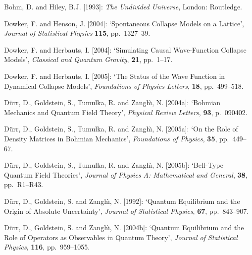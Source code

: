 \documentclass[12pt]{article}
\begin{document}
\begin{thebibliography}{29}
 Bohm, D. and Hiley, B.J. [1993]: \textit{The Undivided Universe}, London: Routledge.  

 Dowker, F. and Henson, J. [2004]: `Spontaneous Collapse Models on a
  Lattice', \textit{Journal of Statistical Physics} \textbf{115}, pp.~1327--39.

 Dowker, F. and Herbauts, I. [2004]: `Simulating Causal Wave-Function Collapse Models', \textit{Classical and Quantum Gravity}, \textbf{21}, pp.~1--17. 

  Dowker, F. and Herbauts, I. [2005]: `The Status of the Wave Function in Dynamical
Collapse Models', \textit{Foundations of Physics Letters}, \textbf{18}, pp.~499--518. 

  D{\"u}rr, D., Goldstein, S., Tumulka, R. and
  Zangh{\`{\i}}, N. [2004a]: `Bohmian Mechanics and Quantum Field Theory',
  \textit{Physical Review Letters}, \textbf{93}, p.~090402.

 D{\"u}rr, D., Goldstein, S., Tumulka, R. and
  Zangh{\`{\i}}, N. [2005a]: `On the Role of Density Matrices in Bohmian Mechanics',
  \textit{Foundations of Physics}, \textbf{35}, pp.~449--67. 

 D{\"u}rr, D., Goldstein, S., Tumulka, R. and
  Zangh{\`{\i}}, N. [2005b]: `Bell-Type Quantum Field Theories',
\textit{Journal of Physics A: Mathematical and General}, \textbf{ 38}, pp.~R1--R43.

 D\"urr, D., Goldstein, S. and Zangh\`\i, N. [1992]: `Quantum
  Equilibrium and the Origin of Absolute Uncertainty', \textit{Journal of
  Statistical Physics}, \textbf{67}, pp.~843--907. 

 D\"urr, D., Goldstein, S. and Zangh\`\i, N. [2004b]: `Quantum
  Equilibrium and the Role of Operators as Observables in Quantum 
  Theory', \textit{Journal of Statistical Physics}, \textbf{116}, pp.~959--1055.


\end{thebibliography}
\end{document}
